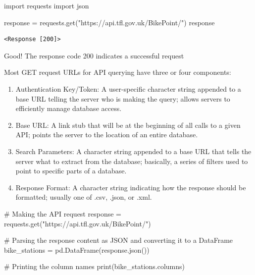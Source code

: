 \documentclass[
  letterpaper,
  DIV=11,
  numbers=noendperiod]{scrreprt}
\newenvironment{Shaded}{\begin{snugshade}}{\end{snugshade}}
\newcommand{\BuiltInTok}[1]{\textcolor[rgb]{0.00,0.23,0.31}{#1}}
\newcommand{\CommentTok}[1]{\textcolor[rgb]{0.37,0.37,0.37}{#1}}
\newcommand{\ImportTok}[1]{\textcolor[rgb]{0.00,0.46,0.62}{#1}}
\newcommand{\NormalTok}[1]{\textcolor[rgb]{0.00,0.23,0.31}{#1}}
\newcommand{\OperatorTok}[1]{\textcolor[rgb]{0.37,0.37,0.37}{#1}}
\newcommand{\StringTok}[1]{\textcolor[rgb]{0.13,0.47,0.30}{#1}}
\providecommand{\tightlist}{%
  \setlength{\itemsep}{0pt}\setlength{\parskip}{0pt}}\usepackage{longtable,booktabs,array}
\begin{document}
\begin{Shaded}
\begin{Highlighting}[]
\ImportTok{import}\NormalTok{ requests}
\ImportTok{import}\NormalTok{ json}

\NormalTok{response }\OperatorTok{=}\NormalTok{ requests.get(}\StringTok{"https://api.tfl.gov.uk/BikePoint/"}\NormalTok{)}
\NormalTok{response}
\end{Highlighting}
\end{Shaded}

\begin{verbatim}
<Response [200]>
\end{verbatim}

Good! The response code 200 indicates a successful request

Most GET request URLs for API querying have three or four components:

\begin{enumerate}
\def\labelenumi{\arabic{enumi}.}
\tightlist
\item
  Authentication Key/Token: A user-specific character string appended to
  a base URL telling the server who is making the query; allows servers
  to efficiently manage database access.
\item
  Base URL: A link stub that will be at the beginning of all calls to a
  given API; points the server to the location of an entire database.
\item
  Search Parameters: A character string appended to a base URL that
  tells the server what to extract from the database; basically, a
  series of filters used to point to specific parts of a database.
\item
  Response Format: A character string indicating how the response should
  be formatted; usually one of .csv, .json, or .xml.
\end{enumerate}

\begin{Shaded}
\begin{Highlighting}[]
\CommentTok{\# Making the API request}
\NormalTok{response }\OperatorTok{=}\NormalTok{ requests.get(}\StringTok{"https://api.tfl.gov.uk/BikePoint/"}\NormalTok{)}

\CommentTok{\# Parsing the response content as JSON and converting it to a DataFrame}
\NormalTok{bike\_stations }\OperatorTok{=}\NormalTok{ pd.DataFrame(response.json())}

\CommentTok{\# Printing the column names}
\BuiltInTok{print}\NormalTok{(bike\_stations.columns)}
\end{Highlighting}
\end{Shaded}
\end{document}
